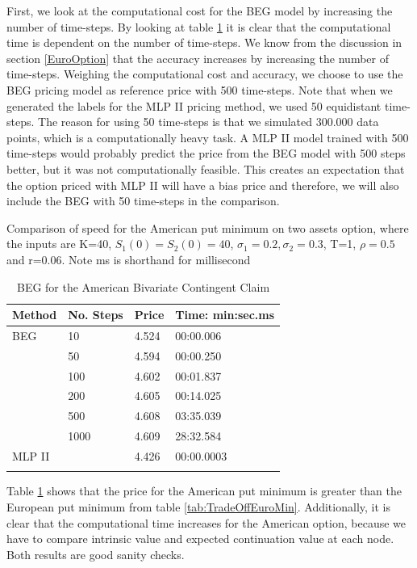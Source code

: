First, we look at the computational cost for the BEG model by increasing the number of time-steps. By looking at table \ref{tab:TradeOffAmerMin} it is clear that the computational time is dependent on the number of time-steps. We know from the discussion in section \ref{EuroOption} that the accuracy increases by increasing the number of time-steps. Weighing the computational cost and accuracy, we choose to use the BEG pricing model as reference price with 500 time-steps. Note that when we generated the labels for the MLP II pricing method, we used 50 equidistant time-steps. The reason for using 50 time-steps is that we simulated 300.000 data points, which is a computationally heavy task. A MLP II model trained with 500 time-steps would probably predict the price from the BEG model with 500 steps better, but it was not computationally feasible. This creates an expectation that the option priced with MLP II will have a bias price and therefore, we will also include the BEG with 50 time-steps in the comparison.\\

\begin{table}[th]
\caption{BEG for the American Bivariate Contingent Claim}{Comparison of speed for the American put minimum on two assets option, where the inputs are K=40, $S_1(0)=S_2(0)=40$, $\sigma_1=0.2, \sigma_2=0.3$, T=1, $\rho=0.5$  and r=0.06. Note ms is shorthand for millisecond}
\label{tab:TradeOffAmerMin}
\centering
\begin{tabular}{l l l l}
\toprule
\textbf{Method} & \textbf{No. Steps} & \textbf{Price} & \textbf{Time: min:sec.ms} \\
\midrule
BEG & 10 & 4.524 & 00:00.006\\
& 50 & 4.594 & 00:00.250\\
& 100 & 4.602 & 00:01.837\\
& 200 & 4.605 & 00:14.025\\
& 500 & 4.608 & 03:35.039\\
& 1000 & 4.609 & 28:32.584\\
MLP II &  & 4.426 & 00:00.0003\\
\bottomrule\\
\end{tabular}
\end{table}

Table \ref{tab:TradeOffAmerMin} shows that the price for the American put minimum is greater than the European put minimum from table \ref{tab:TradeOffEuroMin}. Additionally, it is clear that the computational time increases for the American option, because we have to compare intrinsic value and expected continuation value at each node. Both results are good sanity checks.\\

